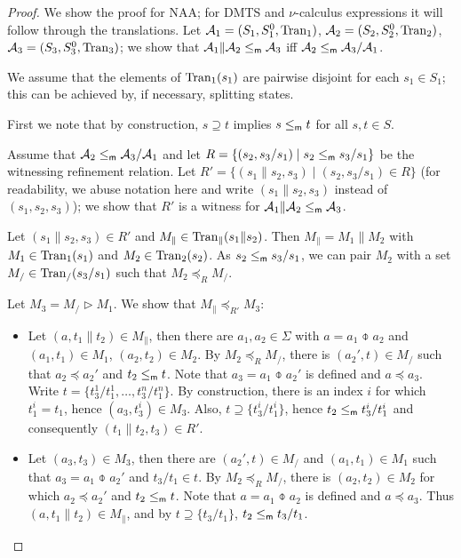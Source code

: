 \documentclass[twocolumn]{svjour3-dummy}
\newcommand*\labpre{\preccurlyeq}
\newcommand*\NAA{NAA\xspace}
\newcommand*\mr{\le_\textup{\textsf{m}}}
\newcommand*\cA{\mathcal A}
\newcommand*\Tran{\textup{\textrm{Tran}}}
\newcommand*\by{/}
\begin{document}
\begin{proof}We show the proof for \NAA; for DMTS and $\nu$-calculus expressions it
  will follow through the translations.  Let $\cA_1=( S_1, S^0_1,
  \Tran_1)$, $\cA_2=( S_2, S^0_2, \Tran_2)$, $\cA_3=( S_3, S^0_3,
  \Tran_3)$; we show that $\cA_1\| \cA_2\mr \cA_3$ iff $\cA_2\mr
  \cA_3\by \cA_1$.

  We assume that the elements of $\Tran_1( s_1)$ are pairwise disjoint
  for each $s_1\in S_1$; this can be achieved by, if necessary,
  splitting states.

  First we note that by construction, $s\supseteq t$ implies $s\mr t$
  for all $s, t\in S$.

  Assume that $\cA_2\mr \cA_3\by \cA_1$ and let $R=\{( s_2, s_3\by
  s_1)\mid s_2\mr s_3\by s_1\}$ be the witnessing refinement relation.
  Let $R'=\{( s_1\| s_2, s_3)\mid( s_2, s_3\by s_1)\in R\}$ (for
  readability, we abuse notation here and write $( s_1\| s_2, s_3)$
  instead of $( s_1, s_2, s_3)$); we show that $R'$ is a witness for
  $\cA_1\| \cA_2\mr \cA_3$.

  Let $( s_1\| s_2, s_3)\in R'$ and $M_\|\in \Tran_\|( s_1\| s_2)$.  Then
  $M_\|= M_1\| M_2$ with $M_1\in \Tran_1( s_1)$ and $M_2\in \Tran_2(
  s_2)$.  As $s_2\mr s_3\by s_1$, we can pair $M_2$ with a set $M_\by\in
  \Tran_\by( s_3\by s_1)$ such that $M_2\labpre_R M_\by$.

  Let $M_3= M_\by\triangleright M_1$.  We show that $M_\|\labpre_{ R'}
  M_3$:
  \begin{itemize}
  \item Let $( a, t_1\| t_2)\in M_\|$, then there are $a_1, a_2\in
    \Sigma$ with $a= a_1\obar a_2$ and $( a_1, t_1)\in M_1$, $( a_2,
    t_2)\in M_2$.  By $M_2\labpre_R M_\by$, there is $( a_2', t)\in
    M_\by$ such that $a_2\labpre a_2'$ and $t_2\mr t$.  Note that
    $a_3= a_1\obar a_2'$ is defined and $a\labpre a_3$.  Write $t=\{
    t_3^1\by t_1^1,\dots, t_3^n\by t_1^n\}$.  By construction, there
    is an index $i$ for which $t_1^i= t_1$, hence $( a_3, t_3^i)\in
    M_3$.  Also, $t\supseteq\{ t_3^i\by t_1^i\}$, hence $t_2\mr
    t_3^i\by t_1^i$ and consequently $( t_1\| t_2, t_3)\in R'$.
  \item Let $( a_3, t_3)\in M_3$, then there are $( a_2', t)\in M_\by$
    and $( a_1, t_1)\in M_1$ such that $a_3= a_1\obar a_2'$ and
    $t_3\by t_1\in t$.  By $M_2\labpre_R M_\by$, there is $( a_2,
    t_2)\in M_2$ for which $a_2\labpre a_2'$ and $t_2\mr t$.  Note
    that $a= a_1\obar a_2$ is defined and $a\labpre a_3$.  Thus $( a,
    t_1\| t_2)\in M_\|$, and by $t\supseteq\{ t_3\by t_1\}$, $t_2\mr
    t_3\by t_1$.
  \end{itemize}


\end{proof}
\end{document}
